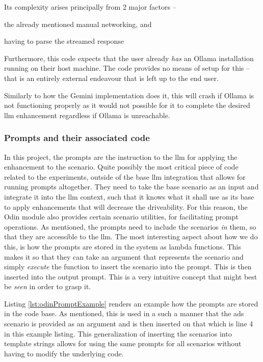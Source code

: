 Its complexity arises principally from \num{2} major factors --
\begin{inparaenum}
    \item the already mentioned manual networking, and
    \item having to parse the streamed response
\end{inparaenum}
Furthermore, this code expects that the user already \emph{has} an Ollama
installation running on their host machine. The code provides no means of setup
for this -- that is an entirely external endeavour that is left up to the end user.

Similarly to how the Gemini implementation does it, this will crash if Ollama is
not functioning properly as it would not possible for it to complete the desired
\acrshort{llm} enhancement regardless if Ollama is unreachable.

% 

\subsubsection{Prompts and their associated code}

In this project, the prompts are the instruction to the \acrshort{llm} for
applying the enhancement to the scenario. Quite possibly the most critical piece
of code related to the experiments, outside of the base \acrshort{llm}
integration that allows for running prompts altogether.
They need to take the base scenario as an
input and integrate it into the \acrshort{llm} context, such that it knows what
it shall use as its base to apply enhancements that will decrease the
driveability. For this reason, the Odin module also provides certain scenario
utilities, for facilitating prompt operations.
As mentioned, the prompts need to include the scenarios \emph{in} them, so that
they are accessible to the \acrshort{llm}.
The most interesting aspect about how we do this, is how the prompts are stored
in the system as lambda functions. This makes it so that they
can take an argument that represents the scenario and simply \emph{execute} the
function to insert the scenario into the prompt. This is then
inserted into the output prompt. This is a very intuitive concept that might
best be \emph{seen} in order to grasp it.

Listing \ref{lst:odinPromptExample} renders an example how the prompts are stored in
the code base. As mentioned, this is used in a such a manner that the
\acrshort{ads} scenario is provided as an argument and is then inserted on that
which is  line \num{4} in this example listing. This generalization of inserting
the scenarios into template strings allows for using the same prompts for all
scenarios without having to modify the underlying code.

